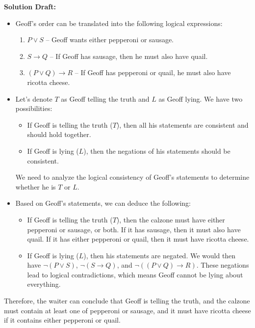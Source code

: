 \documentclass{article}
\begin{document}
\vspace{0.5cm}
\noindent\textbf{Solution Draft:} 
\vspace{0.2cm}

\begin{itemize}
    \item 
        Geoff's order can be translated into the following logical expressions:
        \begin{enumerate}
            \item \( P \lor S \) -- Geoff wants either pepperoni or sausage.
            \item \( S \rightarrow Q \) -- If Geoff has sausage, then he must also have quail.
            \item \( (P \lor Q) \rightarrow R \) -- If Geoff has pepperoni or quail, he must also have ricotta cheese.
        \end{enumerate}

    \item
        Let's denote \( T \) as Geoff telling the truth and \( L \) as Geoff lying. We have two possibilities:
        \begin{itemize}
            \item If Geoff is telling the truth (\( T \)), then all his statements are consistent and should hold together.
            \item If Geoff is lying (\( L \)), then the negations of his statements should be consistent.
        \end{itemize}
        We need to analyze the logical consistency of Geoff's statements to determine whether he is \( T \) or \( L \).

    \item
        Based on Geoff's statements, we can deduce the following:
        \begin{itemize}
            \item If Geoff is telling the truth (\( T \)), then the calzone must have either pepperoni or sausage, or both. If it has sausage, then it must also have quail. If it has either pepperoni or quail, then it must have ricotta cheese.
            \item If Geoff is lying (\( L \)), then his statements are negated. We would then have \( \neg (P \lor S) \), \( \neg (S \rightarrow Q) \), and \( \neg ((P \lor Q) \rightarrow R) \). These negations lead to logical contradictions, which means Geoff cannot be lying about everything.
        \end{itemize}
\end{itemize}
Therefore, the waiter can conclude that Geoff is telling the truth, and the calzone must contain at least one of pepperoni or sausage, and it must have ricotta cheese if it contains either pepperoni or quail.
\end{document}
